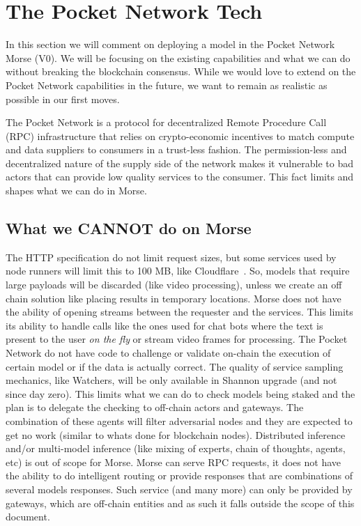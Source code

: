 \section{The Pocket Network Tech}\label{sec:ref}

In this section we will comment on deploying a model in the Pocket Network Morse (V0).
We will be focusing on the existing capabilities and what we can do without breaking the blockchain consensus. While we would love to extend on the Pocket Network capabilities in the future, we want to remain as realistic as possible in our first moves.

The Pocket Network is a protocol for decentralized Remote Procedure Call (RPC) infrastructure that relies on crypto-economic incentives to match compute and data suppliers to consumers in a trust-less fashion. The permission-less and decentralized nature of the supply side of the network makes it vulnerable to bad actors that can provide low quality services to the consumer. This fact limits and shapes what we can do in Morse.


\subsection{What we CANNOT do on Morse}
The HTTP specification do not limit request sizes, but some services used by node runners will limit this to 100 MB, like Cloudflare~\cite{cloudflareLimitsCloudflare}. So, models that require large payloads will be discarded (like video processing), unless we create an off chain solution like placing results in temporary locations.
Morse does not have the ability of opening streams between the requester and the services. This limits its ability to handle calls like the ones used for chat bots where the text is present to the user \emph{on the fly} or stream video frames for processing.
The Pocket Network do not have code to challenge or validate on-chain the execution of certain model or if the data is actually correct. The quality of service sampling mechanics, like Watchers, will be only available in Shannon upgrade (and not since day zero). This limits what we can do to check models being staked and the plan is to delegate the checking to off-chain actors and gateways. The combination of these agents will filter adversarial nodes and they are expected to get no work (similar to whats done for blockchain nodes).
Distributed inference and/or multi-model inference (like mixing of experts, chain of thoughts, agents, etc) is out of scope for Morse. Morse can serve RPC requests, it does not have the ability to do intelligent routing or provide responses that are combinations of several models responses. Such service (and many more) can only be provided by gateways, which are off-chain entities and as such it falls outside the scope of this document.



